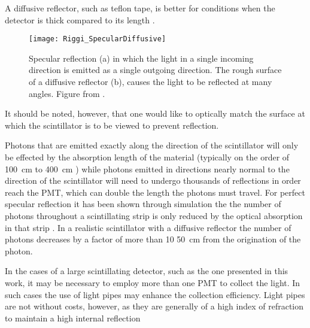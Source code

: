 A diffusive reflector, such as teflon tape, is better for conditions when the detector is thick compared to its length \cite{knoll_radiation_2009}.
\begin{figure}
	\centering
	\texttt{[image: Riggi\_SpecularDiffusive]}
	\caption[Specular and Diffusive Reflection]{Specular reflection (a) in which the light in a single incoming direction is emitted as a single outgoing direction. The rough surface of a diffusive reflector (b), causes the light to be reflected at many angles. Figure from \cite{riggi_introducing_2011}.}
	\label{fig:SpecularDiffusive} 
\end{figure}
It should be noted, however, that one would like to optically match the surface at which the scintillator is to be viewed to prevent reflection.

Photons that are emitted exactly along the direction of the scintillator will only be effected by the  absorption length of the material (typically on the order of \SI{100}{\cm} to \SI{400}{\cm} \cite{SG_PlasticScint_2008}) while photons emitted in directions nearly normal to the direction of the scintillator will need to undergo thousands of reflections in order reach the PMT, which can double the length the photons must travel.
For perfect specular reflection it has been shown through simulation the the number of photons throughout a scintillating strip is only reduced by the optical absorption in that strip \cite{riggi_introducing_2011}.
In a realistic scintillator with a diffusive reflector the number of photons decreases by a factor of more than 10 \SI{50}{\cm} from the origination of the photon\cite{riggi_introducing_2011}.

In the cases of a large scintillating detector, such as the one presented in this work, it  may be necessary to employ more than one PMT to collect the light.
In such cases the use of light pipes may enhance the collection efficiency. 
Light pipes are not without costs, however, as they are generally of a high index of refraction to maintain a high internal reflection

